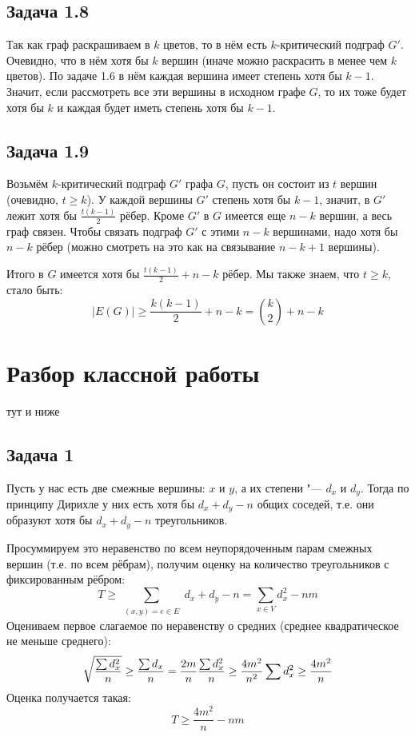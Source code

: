 \subsection{Задача 1.8}
	Так как граф раскрашиваем в $k$ цветов, то в нём есть $k$-критический подграф $G'$.
	Очевидно, что в нём хотя бы $k$ вершин (иначе можно раскрасить в менее чем $k$ цветов).
	По задаче 1.6 в нём каждая вершина имеет степень хотя бы $k-1$.
	Значит, если рассмотреть все эти вершины в исходном графе $G$, то их тоже будет
	хотя бы $k$ и каждая будет иметь степень хотя бы $k-1$.

\subsection{Задача 1.9}
	Возьмём $k$-критический подграф $G'$ графа $G$, пусть он состоит из $t$ вершин
	(очевидно, $t \ge k$).
	У каждой вершины $G'$ степень хотя бы $k-1$, значит, в $G'$ лежит хотя бы $\frac{t(k-1)}{2}$ рёбер.
	Кроме $G'$ в $G$ имеется еще $n-k$ вершин, а весь граф связен.
	Чтобы связать подграф $G'$ с этими $n-k$ вершинами, надо хотя бы $n-k$ рёбер
	(можно смотреть на это как на связывание $n-k+1$ вершины).

	Итого в $G$ имеется хотя бы $\frac{t(k-1)}{2}+n-k$ рёбер.
	Мы также знаем, что $t\ge k$, стало быть:
	\[
		|E(G)| \ge \frac{k(k-1)}{2} + n - k = \binom{k}{2} + n - k
	\]

\section{Разбор классной работы}
\TODO тут и ниже
\subsection{Задача 1}
	Пусть у нас есть две смежные вершины: $x$ и $y$, а их степени "--- $d_x$ и $d_y$.
	Тогда по принципу Дирихле у них есть хотя бы $d_x + d_y - n$ общих соседей,
	т.е. они образуют хотя бы $d_x + d_y - n$ треугольников.

	Просуммируем это неравенство по всем неупорядоченным парам смежных вершин (т.е. по всем рёбрам),
	получим оценку на количество треугольников с фиксированным рёбром:
	\[
		T \ge \sum_{\substack{(x, y)=e \in E}} d_x + d_y - n = \sum_{x \in V} d_x^2 - nm
	\]
	Оцениваем первое слагаемое по неравенству о средних (среднее квадратическое не меньше среднего):
	\[
		\sqrt{\frac{\sum d_x^2}{n}} \ge \frac{\sum d_x}{n} = \frac{2m}{n} \\
		\frac{\sum d_x^2}{n} \ge \frac{4m^2}{n^2} \\
		\sum d_x^2 \ge \frac{4m^2}{n} \\
	\]
	Оценка получается такая:
	\[
		T \ge \frac{4m^2}{n} - nm
	\]

